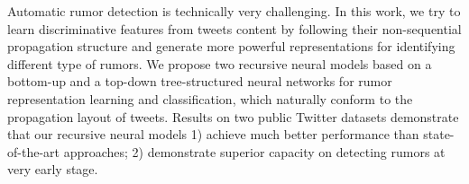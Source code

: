 Automatic rumor detection is technically very challenging. In this work, we try to learn discriminative features from tweets content by following their non-sequential propagation structure and generate more powerful representations for identifying different type of rumors. We propose two recursive neural models based on a bottom-up and a top-down tree-structured neural networks for rumor representation learning and classification, which naturally conform to the propagation layout of tweets. Results on two public Twitter datasets demonstrate that our recursive neural models 1) achieve much better performance than state-of-the-art approaches; 2) demonstrate superior capacity on detecting rumors at very early stage.
